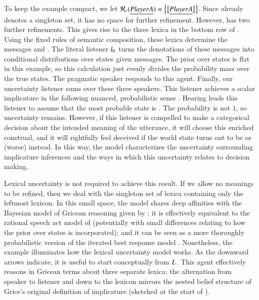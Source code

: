 \documentclass[leqno,12pt]{article}
\begin{document}

To keep the example compact, we let
$\mathcal{R}_{c}(\emph{Player A}) = \left\{ \llbracket\emph{Player A}\rrbracket \right\}$. Since
 already denotes a singleton set, it has no space for
further refinement. However,  has two further
refinements. This gives rise to the three lexica in the bottom row of
.  Using the fixed rules of semantic
composition, these lexica determine the messages  and . The literal listener
$l_{0}$ turns the denotations of these messages into
conditional distributions over states given messages. The prior over
states is flat in this example, so this calculation just evenly
divides the probability mass over the true states. The pragmatic
speaker responds to this agent. Finally, our uncertainty listener sums
over these three speakers. This listener achieves a scalar implicature
in the following nuanced, probabilistic sense
. Hearing  leads this
listener to assume that the most probable state is . The
probability is not $1$, so uncertainty remains. However, if this
listener is compelled to make a categorical decision about the
intended meaning of the utterance, it will choose this enriched
construal, and it will rightfully feel deceived if the world state
turns out to be  or (worse)  instead. In this way,
the model characterizes the uncertainty surrounding implicature
inferences \citep{Hirschberg85} and the ways in which this uncertainty
relates to decision making.

Lexical uncertainty is not required to achieve this result. If we
allow no meanings to be refined, then we deal with the singleton set
of lexica containing only the leftmost lexicon. In this small space,
the model shares deep affinities with the Bayesian model of Gricean
reasoning given by \citet{Russell:2012}; it is effectively equivalent
to the rational speech act model of \citet{Frank:Goodman:2012}
(potentially with small differences relating to how the prior over
states is incorporated); and it can be seen as a more thoroughly
probabilistic version of the iterated best response model
\citep{Franke09DISS,Jaeger:2007,Jaeger:2011}. Nonetheless, the example
illuminates how the lexical uncertainty model works. As the downward
arrows indicate, it is useful to start conceptually from
$L_{}$. This agent effectively reasons in Gricean
terms about three separate lexica; the alternation from speaker to
listener and down to the lexicon mirrors the nested belief structure
of Grice's original definition of implicature (sketched at the start
of ).
\end{document}
